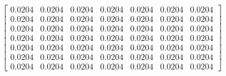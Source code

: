 \documentclass[preview]{standalone}
\begin{document}
\begin{align*}
\begin{bmatrix}0.0204 & 0.0204 & 0.0204 & 0.0204 & 0.0204 & 0.0204 & 0.0204 \\ 0.0204 & 0.0204 & 0.0204 & 0.0204 & 0.0204 & 0.0204 & 0.0204 \\ 0.0204 & 0.0204 & 0.0204 & 0.0204 & 0.0204 & 0.0204 & 0.0204 \\ 0.0204 & 0.0204 & 0.0204 & 0.0204 & 0.0204 & 0.0204 & 0.0204 \\ 0.0204 & 0.0204 & 0.0204 & 0.0204 & 0.0204 & 0.0204 & 0.0204 \\ 0.0204 & 0.0204 & 0.0204 & 0.0204 & 0.0204 & 0.0204 & 0.0204 \\ 0.0204 & 0.0204 & 0.0204 & 0.0204 & 0.0204 & 0.0204 & 0.0204\end{bmatrix}
\end{align*}
\end{document}
